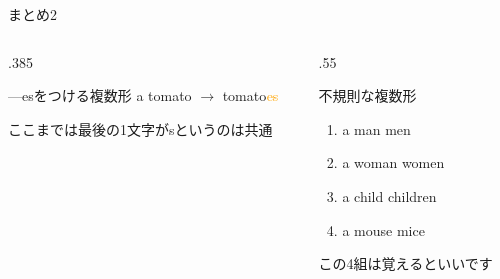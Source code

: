 \documentclass[aspectratio=169,xcolor={dvipsnames,table}]{beamer}
\begin{document}
\begin{frame}[plain]{まとめ2}
\begin{columns}
\begin{column}[t]{.385\textwidth}
\begin{block}{---esをつける複数形}
        a tomato $\longrightarrow$ tomato\textcolor{orange}{es}
        \hfill{}\hspace*{15pt}
      \end{block}
      {\scriptsize ここまでは最後の1文字がsというのは共通}
    \end{column}
    \pause
    \begin{column}[t]{.55\textwidth}
      \begin{block}{不規則な複数形}\small
        \begin{enumerate}
          \item a man \hfill\rightarrow\hfill{}men \hfill\hfill\mbox{}
          \item a woman \hfill\rightarrow\hfill{}women \hfill\mbox{}
          \item a child \hfill\rightarrow\hfill{}children \hfill\mbox{}
          \item a mouse \hfill\rightarrow\hfill{}mice \hfill\hfill\mbox{}
        \end{enumerate}
      \end{block}
      \hfill{\scriptsize この4組は覚えるといいです}
    \end{column}
  \end{columns}
\end{frame}
\end{document}
